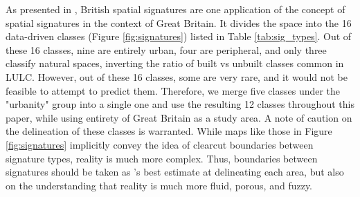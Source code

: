 
As presented in \cite{fleischmann2022geographical}, British spatial signatures are one
application of the concept of spatial signatures in
the context of Great Britain. It divides the space into the 16 data-driven classes
(Figure \ref{fig:signatures}) listed in Table \ref{tab:sig_types}. Out of these 16
classes, nine are entirely urban, four are peripheral, and only three classify natural spaces,
inverting the ratio of built vs unbuilt classes common in LULC. However, out
of these 16 classes, some are very rare, and it would not be feasible to attempt to
predict them. Therefore, we merge five classes under the "urbanity" group into a
single one and use the resulting 12 classes throughout this paper, while using entirety
of Great Britain as a study area.
%
A note of caution on the delineation of these classes is warranted. While maps
like those in Figure \ref{fig:signatures} implicitly convey the idea of
clearcut boundaries between signature types, reality is much more complex.
Thus, boundaries between signatures should be taken as
\cite{fleischmann2022geographical}'s best estimate at delineating each area,
but also on the understanding that reality is much more fluid, porous, and
fuzzy.


